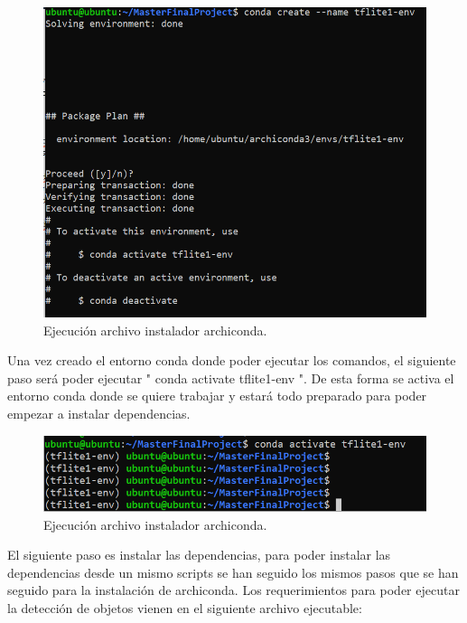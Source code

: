  \begin{figure}[h]
    \centering
    \includegraphics[scale=0.7]{fig/conda create.PNG}
    \caption{Ejecución archivo instalador archiconda.}
    \label{fig:mesh1}
\end{figure}

Una vez creado el entorno conda donde poder ejecutar los comandos, el siguiente paso será poder ejecutar " conda activate tflite1-env ". De esta forma se activa el entorno conda donde se quiere trabajar y estará todo preparado para poder empezar a instalar dependencias.

\begin{figure}[h]
    \centering
    \includegraphics[scale=0.7]{fig/conda activate.PNG}
    \caption{Ejecución archivo instalador archiconda.}
    \label{fig:mesh1}
\end{figure}

El siguiente paso es instalar las dependencias, para poder instalar las dependencias desde un mismo scripts se han seguido los mismos pasos que se han seguido para la instalación de archiconda. Los requerimientos para poder ejecutar la detección de objetos vienen en el siguiente archivo ejecutable:

